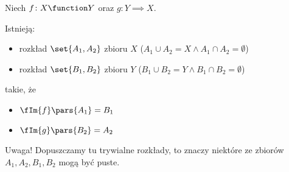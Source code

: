 \begin{lemma}[Banach]
\label{mfi:banach_lemma}
Niech \(f\colon X \function Y\) oraz \(g\colon Y \implies X\).

Istnieją:
\begin{itemize}
    \item rozkład \(\set{A_1, A_2}\) zbioru \(X\) (\(A_1 \cup A_2 = X \land A_1 \cap A_2 = \emptyset\))
    \item rozkład \(\set{B_1, B_2}\) zbioru \(Y\) (\(B_1 \cup B_2 = Y \land B_1 \cap B_2 = \emptyset\))
\end{itemize}
takie, że
\begin{itemize}
    \item \(\fIm{f}\pars{A_1} = B_1\)
    \item \(\fIm{g}\pars{B_2} = A_2\)
\end{itemize}
Uwaga! Dopuszczamy tu trywialne rozkłady, to znaczy niektóre ze zbiorów \(A_1, A_2, B_1, B_2\) mogą być puste.
\end{lemma}
